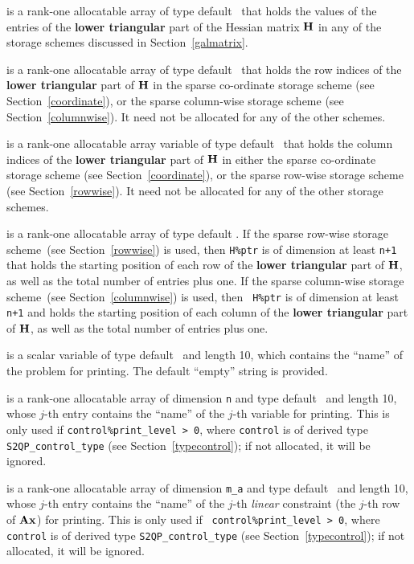 \documentclass{galahad}
\newcommand{\packagename}{S2QP}
\begin{document}
\begin{description}
\begin{description}
 is a rank-one allocatable array of type default \realdp\ that holds
the values of the entries of the {\bf lower triangular} part
of the Hessian matrix ${\mathbf{H}}$ in any of the 
storage schemes discussed in Section~\ref{galmatrix}.

 is a rank-one allocatable array of type default \integer\
that holds the row indices of the {\bf lower triangular} part of
${\mathbf{H}}$ in the sparse co-ordinate storage scheme (see
Section~\ref{coordinate}), or the sparse column-wise storage scheme
(see Section~\ref{columnwise}).  It need not be allocated for any of
the other schemes.

 is a rank-one allocatable array variable of type default \integer\
that holds the column indices of the {\bf lower triangular} part of 
${\mathbf{H}}$ in either the sparse co-ordinate storage scheme 
(see Section~\ref{coordinate}), or the sparse row-wise 
storage scheme (see Section~\ref{rowwise}).
It need not be allocated for any of the other storage schemes.

 is a rank-one allocatable array of type default \integer.
If the sparse row-wise storage scheme~(see Section~\ref{rowwise}) is
used, then {\tt H\%ptr} is of dimension at least {\tt n+1} that holds the starting position
of each row of the {\bf lower triangular} part of ${\mathbf{H}}$, as well as
the total number of entries plus one.  If the sparse column-wise
storage scheme~(see Section~\ref{columnwise}) is used, then {\tt
  H\%ptr} is of dimension at least {\tt n+1} and holds the starting position of each column
of the {\bf lower triangular} part of ${\mathbf{H}}$, as well as the total
number of entries plus one.

\end{description}

 is a scalar variable of type 
default \character\ and length 10, which contains the
``name'' of the problem for printing. The default ``empty'' string is
provided.

 is a rank-one allocatable array of dimension {\tt n} and type 
default \character\ and length 10, whose $j$-th entry contains the
``name'' of the $j$-th variable for printing. This is only used 
if {\tt control\%print\_level > 0}, where {\tt control} is of derived
type {\tt \packagename\_control\_type} (see
Section~\ref{typecontrol}); if not allocated, it will be ignored.

\itt{ANAMES} is a rank-one allocatable array of dimension {\tt m\_a}
and type default \character\ and length 10, whose $j$-th entry
contains the ``name'' of the $j$-th {\em linear} constraint (the
$j$-th row of ${\mathbf{A}}{\mathbf{x}}$) for printing.  This is only used if {\tt
  control\%print\_level > 0}, where {\tt control} is of derived type
{\tt \packagename\_control\_type} (see Section~\ref{typecontrol}); if
not allocated, it will be ignored.


\end{description}
\end{document}
